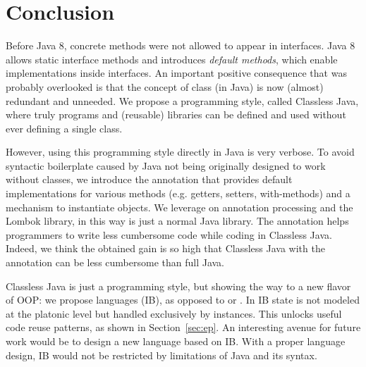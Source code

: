 \section{Conclusion}\label{sec:conclusion}
Before Java 8, concrete methods were not allowed
to appear in interfaces.  Java 8 allows static interface methods and
introduces \emph{default methods}, which enable implementations
inside interfaces. An important positive consequence that
was probably overlooked is that the concept of class
(in Java) is now (almost) redundant and unneeded.
We propose a programming style, called Classless Java, where
truly \objectoriented programs and (reusable) libraries
can be defined and used without ever defining a single class.

However, using this programming style directly in Java is very verbose.
To avoid syntactic boilerplate
caused by Java not being originally designed to work without classes,
we introduce the \mixin annotation that provides default implementations
for various methods (e.g. getters, setters, with-methods) and a
mechanism to instantiate objects.
We leverage on annotation processing and the Lombok library, in this way
\mixin is just a normal Java library.
The \mixin annotation helps programmers
to write less cumbersome code while coding in Classless Java. Indeed,
we think the obtained gain is so high that Classless Java with the \mixin
annotation can be less cumbersome than full Java.

Classless Java is just a programming style, but showing the way
to a new flavor of OOP: we propose \interfacebased
\objectoriented languages (IB), as opposed to \classbased or
\prototypebased. In IB state is not modeled at the platonic
level but handled exclusively by instances.  This unlocks useful
code reuse patterns, as shown in Section~\ref{sec:ep}.
An interesting avenue for future work would be to design a new
language based on IB. With a proper language design, IB would not be restricted 
by limitations of Java and its syntax.





